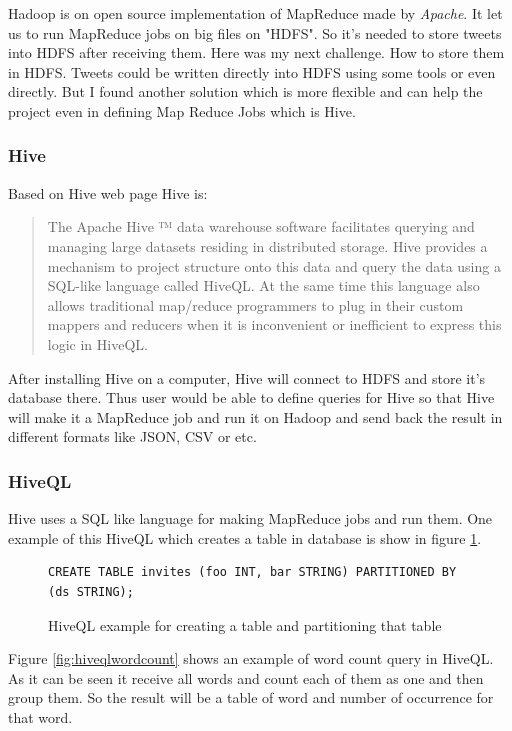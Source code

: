\documentclass[a4paper,11pt]{report}
\begin{document}
Hadoop is on open source implementation of MapReduce made by \emph{Apache}. It let us to run MapReduce jobs on big files on "HDFS". So it's needed to store tweets into HDFS after receiving them. Here was my next challenge. How to store them in HDFS. Tweets could be written directly into HDFS using some tools or even directly. But I found another solution which is more flexible and can help the project even in defining Map Reduce Jobs which is Hive.

\subsubsection{Hive}

Based on Hive web page Hive is:
\begin{quote}
The Apache Hive ™ data warehouse software facilitates querying and managing large datasets residing in distributed storage. Hive provides a mechanism to project structure onto this data and query the data using a SQL-like language called HiveQL. At the same time this language also allows traditional map/reduce programmers to plug in their custom mappers and reducers when it is inconvenient or inefficient to express this logic in HiveQL.
\end{quote}
After installing Hive on a computer, Hive will connect to HDFS and store it's database there. Thus user would be able to define queries for Hive so that Hive will make it a MapReduce job and run it on Hadoop and send back the result in different formats like JSON, CSV or etc.

\subsubsection{HiveQL}

Hive uses a SQL like language for making MapReduce jobs and run them. One example of this HiveQL which creates a table in database is show in figure \ref{fig:hiveqltable}.

\begin{figure}[!hbp]
\caption{HiveQL example for creating a table and partitioning that table}
\begin{lstlisting}
CREATE TABLE invites (foo INT, bar STRING) PARTITIONED BY (ds STRING);
\end{lstlisting}
\label{fig:hiveqltable}
\end{figure}

Figure \ref{fig:hiveqlwordcount} shows an example of word count query in HiveQL. As it can be seen it receive all words and count each of them as one and then group them. So the result will be a table of word and number of occurrence for that word.
\end{document}
